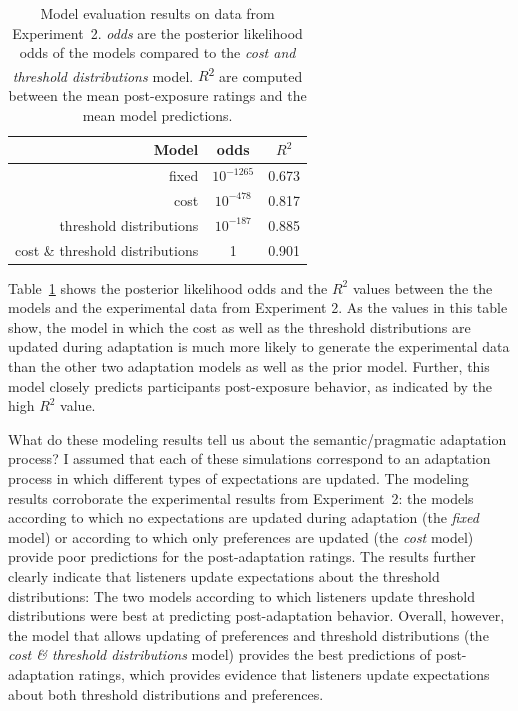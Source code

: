 \begin{table}
\center
\begin{tabular}{r | c | c }
Model &   odds  &  $R^2$ \\ \midrule
fixed & $10^{-1265}$ &  0.673       \\
cost & $10^{-478}$ & 0.817     \\
threshold distributions & $10^{-187}$ &  0.885 \\
cost \& threshold distributions & 1 &  0.901 \\
\end{tabular}
\caption{Model evaluation results on data from Experiment~2.   \textit{odds} are the posterior likelihood odds of the models compared to the \textit{cost and threshold distributions} model.  $R$\textsuperscript{$2$} are computed between  the mean post-exposure ratings and the mean model predictions. \label{tbl:model-comparison-replication}}
\end{table}

Table~\ref{tbl:model-comparison-replication} shows 
the posterior likelihood odds and the $R^2$ values between the the models and the experimental data from Experiment 2. 
As the values in this table show, the model in which the cost as well as the threshold 
distributions are updated during adaptation is much more likely to generate the experimental data than the other two adaptation models
as well as the prior model. Further, this model closely predicts participants post-exposure behavior, as indicated by the high $R^2$ value. 
 
 
What do these modeling results tell us about the semantic/pragmatic adaptation process? 
I assumed that each of these simulations
correspond to an adaptation process in which different types of expectations are  updated.
The modeling results corroborate the experimental results from Experiment~2:
the models according to which no expectations are updated during adaptation (the \textit{fixed} model) 
or according to which only preferences are updated (the \textit{cost} model) provide poor predictions for the post-adaptation
ratings. The results further clearly indicate that listeners update expectations about the threshold distributions: The two models according to 
which listeners update threshold distributions were best at predicting post-adaptation behavior. Overall, however, the model that allows updating
of preferences and threshold distributions (the \textit{cost \& threshold distributions} model) provides the best predictions of post-adaptation ratings, which
provides evidence that listeners update expectations about both {threshold distributions} and {preferences}. 


